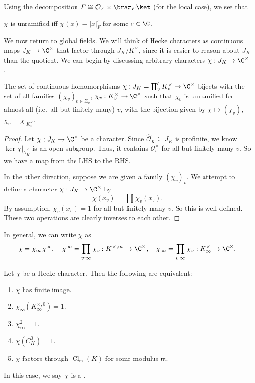 \documentclass[a4paper]{article}
\DeclareMathOperator\Cl{\mathrm{Cl}}
\begin{document}
Using the decomposition $F \cong \mathcal{O}_F \times \bra \pi_F\ket$ (for the local case), we see that
\begin{prop}
  $\chi$ is unramified iff $\chi(x) = |x|_F^s$ for some $s \in \C$.\fakeqed
\end{prop}

We now return to global fields. We will think of Hecke characters as continuous maps $J_K \to \C^\times$ that factor through $J_K/K^\times$, since it is easier to reason about $J_K$ than the quotient. We can begin by discussing arbitrary characters $\chi: J_K \to \C^\times$.

\begin{prop}
  The set of continuous homomorphisms $\chi: J_K = \prod_v' K_v^\times \to \C^\times$ bijects with the set of all families $(\chi_v)_{v \in \Sigma_k}$, $\chi_v: K_v^\times \to \C^\times$ such that $\chi_v$ is unramified for almost all (i.e.\ all but finitely many) $v$, with the bijection given by $\chi \mapsto (\chi_v)$, $\chi_v = \chi|_{K_v^\times}$.
\end{prop}

\begin{proof}
  Let $\chi: J_K \to \C^\times$ be a character. Since $\hat{\mathcal{O}}_K \subseteq J_K$ is profinite, we know $\ker \chi|_{\hat{\mathcal{O}}_K^\times}$ is an open subgroup. Thus, it contains $\mathcal{O}_v^\times$ for all but finitely many $v$. So we have a map from the LHS to the RHS.

  In the other direction, suppose we are given a family $(\chi_v)_v$. We attempt to define a character $\chi: J_K \to \C^\times$ by
  \[
    \chi(x_v) = \prod \chi_v(x_v).
  \]
  By assumption, $\chi_v(x_v) = 1$ for all but finitely many $v$. So this is well-defined. These two operations are clearly inverses to each other.
\end{proof}
In general, we can write $\chi$ as
\[
  \chi = \chi_\infty \chi^\infty,\quad \chi^\infty = \prod_{v \nmid \infty} \chi_v: K^{\times, \infty} \to \C^\times, \quad \chi_\infty = \prod_{v \mid \infty} \chi_v: K_\infty^\times \to \C^\times.
\]

\begin{lemma}
  Let $\chi$ be a Hecke character. Then the following are equivalent:
  \begin{enumerate}
    \item $\chi$ has finite image.
    \item $\chi_\infty(K_\infty^{\times, 0}) = 1$.
    \item $\chi_\infty^2 = 1$.
    \item $\chi(C_K^0) = 1$.
    \item $\chi$ factors through $\Cl_{\mathfrak{m}}(K)$ for some modulus $\mathfrak{m}$.
  \end{enumerate}
  In this case, we say $\chi$ is a .
\end{lemma}
\end{document}

